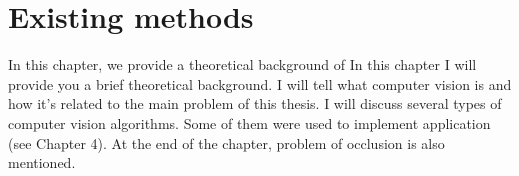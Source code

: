 \chapter{Existing methods}
In this chapter, we provide a theoretical background of 
In this chapter I will provide you a brief theoretical background. I will tell
what computer vision is and how it’s related to the main problem of this
thesis. I will discuss several types of computer vision algorithms. Some of
them were used to implement application (see Chapter 4). At the end of the
chapter, problem of occlusion is also mentioned.